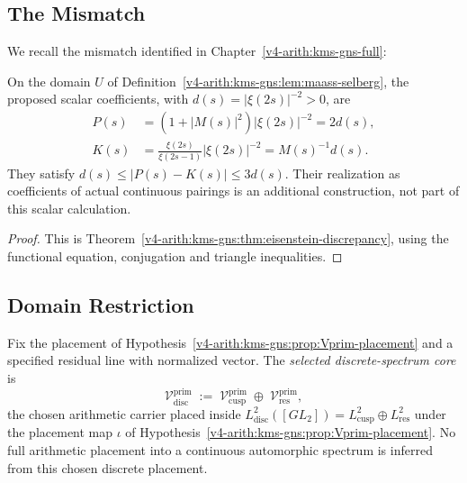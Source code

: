 \subsection{The Mismatch}
\label{v4-arith:w5-c:eisenstein:mismatch}

We recall the mismatch identified in Chapter~\ref{v4-arith:kms-gns-full}:

\begin{proposition}
\label{v4-arith:w5-c:prop:mismatch}
On the domain \(U\) of
Definition~\ref{v4-arith:kms-gns:lem:maass-selberg}, the proposed
scalar coefficients, with \(d(s)=|\xi(2s)|^{-2}>0\), are
\begin{align}
\label{v4-arith:w5-c:eq:Pet-density}
 P(s)&=(1+|M(s)|^2)|\xi(2s)|^{-2}=2d(s),\\
\label{v4-arith:w5-c:eq:Koszul-density}
 K(s)&=\frac{\xi(2s)}{\xi(2s-1)}|\xi(2s)|^{-2}=M(s)^{-1}d(s).
\end{align}
They satisfy \(d(s)\leq|P(s)-K(s)|\leq3d(s)\).
Their realization as coefficients of actual continuous pairings is
an additional construction, not part of this scalar calculation.
\end{proposition}
\begin{proof}
This is Theorem~\ref{v4-arith:kms-gns:thm:eisenstein-discrepancy},
using the functional equation, conjugation and triangle inequalities.
\end{proof}

\subsection{Domain Restriction}
\label{v4-arith:w5-c:eisenstein:domain}

\begin{definition}
\label{v4-arith:w5-c:def:discrete-core}
Fix the placement of Hypothesis~\ref{v4-arith:kms-gns:prop:Vprim-placement}
and a specified residual line with normalized vector. The
\emph{selected discrete-spectrum core} is
\begin{equation}
\label{v4-arith:w5-c:eq:discrete-core-def}
\mathcal{V}^{\mathrm{prim}}_{\mathrm{disc}}\;:=\;\mathcal{V}^{\mathrm{prim}}_{\mathrm{cusp}}\;\oplus\;\mathcal{V}^{\mathrm{prim}}_{\mathrm{res}},
\end{equation}
the chosen arithmetic carrier placed inside
\(L^{2}_{\mathrm{disc}}([GL_{2}])=L^{2}_{\mathrm{cusp}}\oplus L^{2}_{\mathrm{res}}\)
under the placement map
\(\iota\) of Hypothesis~\ref{v4-arith:kms-gns:prop:Vprim-placement}.
No full arithmetic placement into a continuous automorphic
spectrum is inferred from this chosen discrete placement.
\end{definition}


